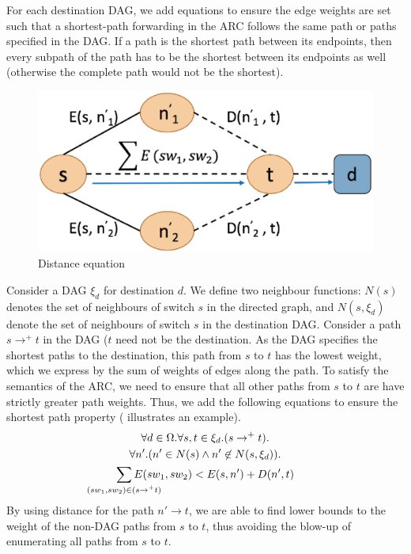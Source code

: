 For each destination DAG, we add equations to ensure the 
edge weights are set such that a shortest-path forwarding in the ARC 
follows the same path or paths specified in the DAG. If a path
is the shortest path between its endpoints, then every 
subpath of the path has to be the shortest between its endpoints
as well (otherwise the complete path would not be the shortest).
\begin{figure}[h!] 
	\centering
	\includegraphics[width=0.8\columnwidth]{figures/distanceEquation.eps}
	\caption{Distance equation} \label{fig:disteq}
\end{figure}
Consider a DAG $\xi_d$ for destination $d$. We define two neighbour
functions: $N(s)$ denotes the set of neighbours of switch $s$ 
in the directed graph, and $N(s, \xi_d)$ denote the set of
neighbours of switch $s$ in the destination DAG. 
Consider a path $s \rightarrow^+ t$ in the DAG ($t$ 
need not be the destination. As the DAG specifies
the shortest paths to the destination, this 
path from $s$ to $t$ has the lowest weight, 
which we express by the sum of weights of 
edges along the path. 
To satisfy the semantics of the ARC,
we need to ensure that all other
paths from $s$ to $t$ are have strictly 
greater path weights.
Thus, we add the following equations to ensure the
shortest path property ( illustrates 
an example).
\begin{multline} \label{eq:uniq}
		\forall d \in \Omega. \forall s, t \in \xi_d. (s \rightarrow^+ t).\\ 
		\forall n'. (n' \in N(s) \wedge n' \not\in N(s, \xi_d)). \\
		\sum_{\mathclap{\substack{(sw_1, sw_2) \in (s \rightarrow^+ t)}}} 
		E(sw_1, sw_2) < E(s, n') + D(n', t)
\end{multline}
By using distance for the path $n' \rightarrow t$, we 
are able to find lower bounds to the weight of the non-DAG 
paths from $s$ to $t$,
thus avoiding the blow-up of enumerating all paths from $s$
to $t$. 


